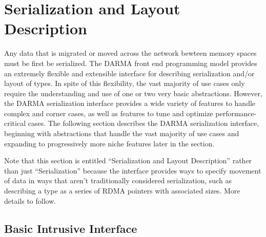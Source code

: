 
\section{Serialization and Layout Description}
\label{sec:serialization}

\lstMakeShortInline[style=CppCodeInlineStyle]{\|}

Any data that is migrated or moved across the network bewteen \glspl{memory space} must be
first be serialized.
The \gls{DARMA} \gls{front end} \gls{programming model} provides an extremely flexible and
extensible interface for describing serialization and/or layout of \CC{} types. 
In spite of this flexibility, the vast majority of use cases only require the
understanding and use of one or two very basic abstractions.  However, the
\gls{DARMA} serialization interface provides a wide variety of features to handle complex
and corner cases, as well as features to tune and optimize performance-critical
cases.  The following section describes the \gls{DARMA} serialization interface,
beginning with abstractions that handle the vast majority of use cases and
expanding to progressively more niche features later in the section.

Note that this section is entitled ``Serialization and Layout Description''
rather than just ``Serialization'' because the interface provides ways to
specify movement of data in ways that aren't traditionally considered
serialization, such as describing a type as a series of \gls{RDMA} pointers with
associated sizes.  More details to follow.

\subsection{Basic Intrusive Interface}
\label{ssec:serbasic}

